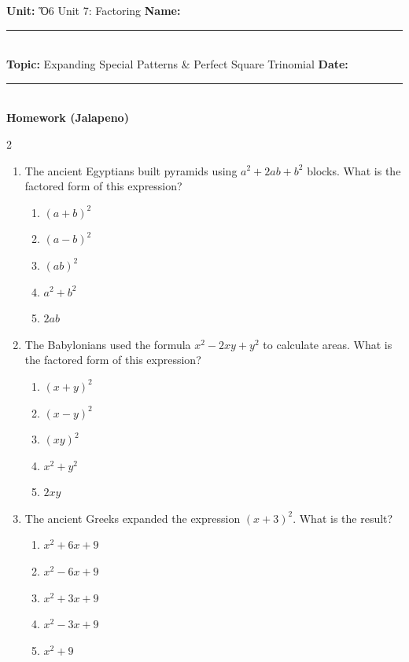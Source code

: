 \documentclass[10pt]{article}
\begin{document}
\enlargethispage{2.5cm}

\begin{tcolorbox}[colback=mainblue!5, colframe=mainblue, sharp corners, boxrule=0.5pt]
    \small \textbf{Unit:} Ὅ6 Unit 7: Factoring \hfill \textbf{Name:} \rule{3cm}{0.4pt} \\
    \small \textbf{Topic:} Expanding Special Patterns & Perfect Square Trinomial \hfill \textbf{Date:} \rule{2cm}{0.4pt} \\
    \centering \textbf{\large Homework (Jalapeno)}
\end{tcolorbox}

\vspace{0.2cm}

\begin{multicols}{2}
\begin{enumerate}[label=\textbf{Q\arabic*.}, leftmargin=*, itemsep=6pt, parsep=0pt]

  \item \small The ancient Egyptians built pyramids using $a^2 + 2ab + b^2$ blocks. What is the factored form of this expression?
  \begin{enumerate}[label=(\Alph*), leftmargin=0.6cm, nosep, itemsep=2pt]
    \item $(a+b)^2$
    \item $(a-b)^2$
    \item $(ab)^2$
    \item $a^2 + b^2$
    \item $2ab$
  \end{enumerate}

  \item \small The Babylonians used the formula $x^2 - 2xy + y^2$ to calculate areas. What is the factored form of this expression?
  \begin{enumerate}[label=(\Alph*), leftmargin=0.6cm, nosep, itemsep=2pt]
    \item $(x+y)^2$
    \item $(x-y)^2$
    \item $(xy)^2$
    \item $x^2 + y^2$
    \item $2xy$
  \end{enumerate}

  \item \small The ancient Greeks expanded the expression $(x+3)^2$. What is the result?
  \begin{enumerate}[label=(\Alph*), leftmargin=0.6cm, nosep, itemsep=2pt]
    \item $x^2 + 6x + 9$
    \item $x^2 - 6x + 9$
    \item $x^2 + 3x + 9$
    \item $x^2 - 3x + 9$
    \item $x^2 + 9$
  \end{enumerate}


\end{enumerate}
\end{multicols}
\end{document}
